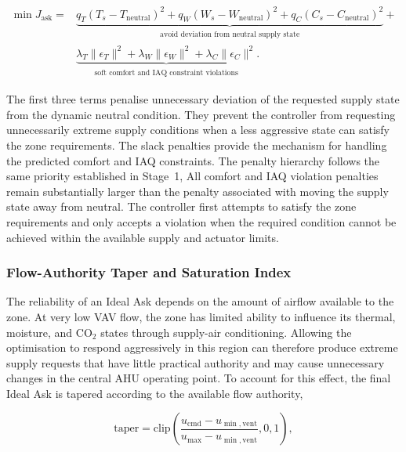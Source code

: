 \documentclass[12pt, a4paper]{article}
\begin{document}
	\begin{equation}
		\begin{aligned}
			\min  J_{\mathrm{ask}}
			={}&
			\underbrace{
				q_T\left(T_s-T_{\mathrm{neutral}}\right)^2
				+
				q_W\left(W_s-W_{\mathrm{neutral}}\right)^2
				+
				q_C\left(C_s-C_{\mathrm{neutral}}\right)^2
			}_{\substack{\text{avoid deviation from neutral supply state}}}
			+
			\\[6pt]
			&
			\underbrace{
				\lambda_T\|\epsilon_T\|^2
				+
				\lambda_W\|\epsilon_W\|^2
				+
				\lambda_C\|\epsilon_C\|^2
			}_{\substack{\text{soft comfort and IAQ constraint violations}}}.
		\end{aligned}
		\label{eq:ask_objective}
	\end{equation}
	
	The first three terms penalise unnecessary deviation of the requested supply state from the dynamic neutral condition. They prevent the controller from requesting unnecessarily extreme supply conditions when a less aggressive state can satisfy the zone requirements.	The slack penalties provide the mechanism for handling the predicted comfort and IAQ constraints. The penalty hierarchy follows the same priority established in Stage~1, All comfort and IAQ violation penalties remain substantially larger than the penalty associated with moving the supply state away from neutral. The controller first attempts to satisfy the zone requirements and only accepts a violation when the required condition cannot be achieved within the available supply and actuator limits.	
	
	\subsubsection{Flow-Authority Taper and Saturation Index}
	
	The reliability of an Ideal Ask depends on the amount of airflow available to the zone. At very low VAV flow, the zone has limited ability to influence its thermal, moisture, and CO$_2$ states through supply-air conditioning. Allowing the optimisation to respond aggressively in this region can therefore produce extreme supply requests that have little practical authority and may cause unnecessary changes in the central AHU operating point.	To account for this effect, the final Ideal Ask is tapered according to the available flow authority,
	
	\begin{equation}
		\mathrm{taper}
		=
		\mathrm{clip}\!\left(
		\frac{u_{\mathrm{cmd}}-u_{\min,\mathrm{vent}}}
		{u_{\max}-u_{\min,\mathrm{vent}}},
		0,1
		\right),
		\label{eq:taper}
	\end{equation}
	
\end{document}
